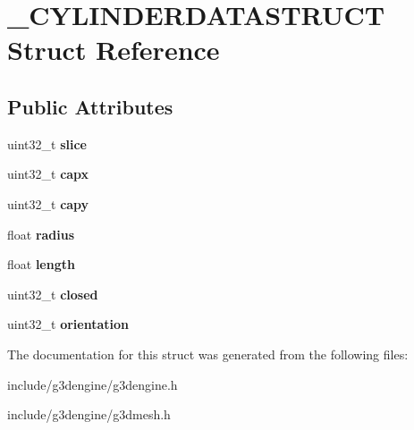 \hypertarget{struct__CYLINDERDATASTRUCT}{}\section{\+\_\+\+C\+Y\+L\+I\+N\+D\+E\+R\+D\+A\+T\+A\+S\+T\+R\+U\+CT Struct Reference}
\label{struct__CYLINDERDATASTRUCT}
\subsection*{Public Attributes}
\begin{DoxyCompactItemize}
\item 
\mbox{\label{struct__CYLINDERDATASTRUCT_a59b1a77f97ba2b39f318f70bcd59988d}} 
uint32\+\_\+t {\bfseries slice}
\item 
\mbox{\label{struct__CYLINDERDATASTRUCT_a452f4c09098be3e336b3c26e264ffb1c}} 
uint32\+\_\+t {\bfseries capx}
\item 
\mbox{\label{struct__CYLINDERDATASTRUCT_a169b160fa19c83358c7120143e650e71}} 
uint32\+\_\+t {\bfseries capy}
\item 
\mbox{\label{struct__CYLINDERDATASTRUCT_a35ad6abc2ea2fe6781b92fb31b32544a}} 
float {\bfseries radius}
\item 
\mbox{\label{struct__CYLINDERDATASTRUCT_a974890e95fa643de2b6a2755ab084967}} 
float {\bfseries length}
\item 
\mbox{\label{struct__CYLINDERDATASTRUCT_aa810a725465efb3cf53c81e138fdf741}} 
uint32\+\_\+t {\bfseries closed}
\item 
\mbox{\label{struct__CYLINDERDATASTRUCT_a6866b4a4311df714f98046208f7d98df}} 
uint32\+\_\+t {\bfseries orientation}
\end{DoxyCompactItemize}


The documentation for this struct was generated from the following files\+:\begin{DoxyCompactItemize}
\item 
include/g3dengine/g3dengine.\+h\item 
include/g3dengine/g3dmesh.\+h\end{DoxyCompactItemize}
